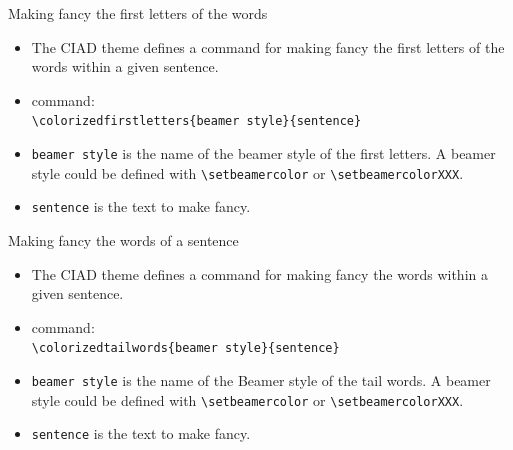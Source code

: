 \documentclass[english,sectioncirclenumberstyle]{ciadbeamer}
\begin{document}
\begin{frame}{{Making fancy} the first letters of the words}
	\begin{itemize}
	\item The CIAD theme defines a command for making fancy the first letters of the words within a given sentence.
	\item command:\\
		\texttt{{\textbackslash}colorizedfirstletters\{beamer style\}\{sentence\}}
	\item \texttt{beamer style} is the name of the beamer style of the first letters. A beamer style could be defined with \texttt{{\textbackslash}setbeamercolor} or \texttt{{\textbackslash}setbeamercolorXXX}.
	\item \texttt{sentence} is the text to make fancy.
	\end{itemize}
	\begin{example}
	\end{example}
\end{frame}

\begin{frame}{{Making fancy} the words of a sentence}
	\begin{itemize}
	\item The CIAD theme defines a command for making fancy the words within a given sentence.
	\item command:\\
		\texttt{{\textbackslash}colorizedtailwords\{beamer style\}\{sentence\}}
	\item \texttt{beamer style} is the name of the Beamer style of the tail words. A beamer style could be defined with \texttt{{\textbackslash}setbeamercolor} or \texttt{{\textbackslash}setbeamercolorXXX}.
	\item \texttt{sentence} is the text to make fancy.
	\end{itemize}
	\begin{example}
	\end{example}
\end{frame}
\end{document}
